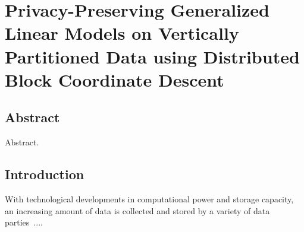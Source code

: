\chapter{Privacy-Preserving Generalized Linear Models on Vertically Partitioned Data using Distributed Block Coordinate Descent}

\papercitationChaFive{}
\clearpage

\begin{refsection}
\UseRawInputEncoding
\section*{Abstract}Abstract.

\cleardoublepage

\section{Introduction}
With technological developments in computational power and storage capacity, an increasing amount of data is collected and stored by a variety of data parties~\cite{kaisler2013big}....


\end{refsection}